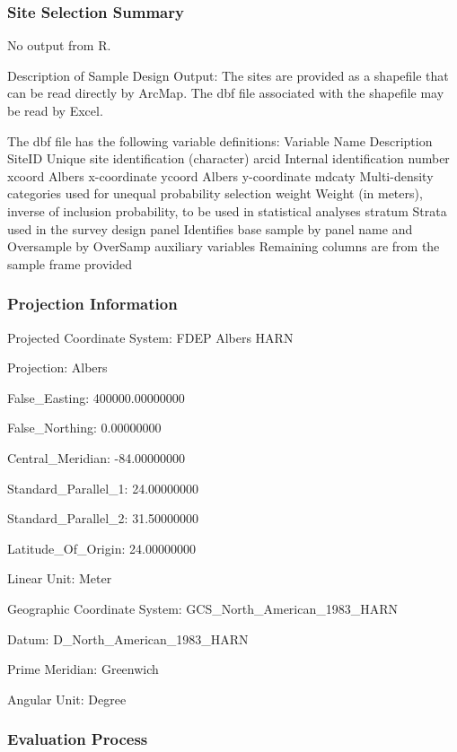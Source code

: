 \documentclass[
]{article}
\begin{document}
\hypertarget{site-selection-summary}{%
\subsubsection{\texorpdfstring{\textbf{Site Selection
Summary}}{Site Selection Summary}}\label{site-selection-summary}}

No output from R.

Description of Sample Design Output: The sites are provided as a
shapefile that can be read directly by ArcMap. The dbf file associated
with the shapefile may be read by Excel.

The dbf file has the following variable definitions: Variable Name
Description SiteID Unique site identification (character) arcid Internal
identification number xcoord Albers x-coordinate ycoord Albers
y-coordinate mdcaty Multi-density categories used for unequal
probability selection weight Weight (in meters), inverse of inclusion
probability, to be used in statistical analyses stratum Strata used in
the survey design panel Identifies base sample by panel name and
Oversample by OverSamp auxiliary variables Remaining columns are from
the sample frame provided

\hypertarget{projection-information}{%
\subsubsection{\texorpdfstring{\textbf{Projection
Information}}{Projection Information}}\label{projection-information}}

Projected Coordinate System: FDEP Albers HARN

Projection: Albers

False\_Easting: 400000.00000000

False\_Northing: 0.00000000

Central\_Meridian: -84.00000000

Standard\_Parallel\_1: 24.00000000

Standard\_Parallel\_2: 31.50000000

Latitude\_Of\_Origin: 24.00000000

Linear Unit: Meter

Geographic Coordinate System: GCS\_North\_American\_1983\_HARN

Datum: D\_North\_American\_1983\_HARN

Prime Meridian: Greenwich

Angular Unit: Degree

\hypertarget{evaluation-process}{%
\subsubsection{\texorpdfstring{\textbf{Evaluation
Process}}{Evaluation Process}}\label{evaluation-process}}
\end{document}
